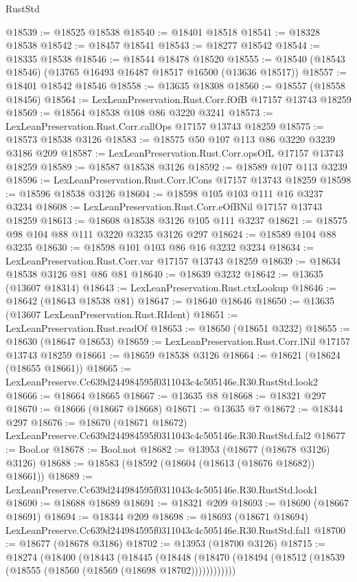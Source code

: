 \begin{lexlean}{RustStd}
\begin{coremodule}
@18539 := @18525 @18538
@18540 := @18401 @18518
@18541 := @18328 @18538
@18542 := @18457 @18541
@18543 := @18277 @18542
@18544 := @18335 @18538
@18546 := @18544 @18478 @18520
@18555 := @18540 (@18543 @18546) (@13765 @16493 @16487 @18517 @16500 (@13636 @18517))
@18557 := @18401 @18542 @18546
@18558 := @13635 @18308
@18560 := @18557 (@18558 @18456)
@18564 := LexLeanPreservation.Rust.Corr.fOfB @17157 @13743 @18259
@18569 := @18564 @18538 @108 @86 @3220 @3241
@18573 := LexLeanPreservation.Rust.Corr.callOps @17157 @13743 @18259
@18575 := @18573 @18538 @3126
@18583 := @18575 @50 @107 @113 @86 @3220 @3239 @3186 @209
@18587 := LexLeanPreservation.Rust.Corr.opsOfL @17157 @13743 @18259
@18589 := @18587 @18538 @3126
@18592 := @18589 @107 @113 @3239
@18596 := LexLeanPreservation.Rust.Corr.lCons @17157 @13743 @18259
@18598 := @18596 @18538 @3126
@18604 := @18598 @105 @103 @111 @16 @3237 @3234
@18608 := LexLeanPreservation.Rust.Corr.eOfBNil @17157 @13743 @18259
@18613 := @18608 @18538 @3126 @105 @111 @3237
@18621 := @18575 @98 @104 @88 @111 @3220 @3235 @3126 @297
@18624 := @18589 @104 @88 @3235
@18630 := @18598 @101 @103 @86 @16 @3232 @3234
@18634 := LexLeanPreservation.Rust.Corr.var @17157 @13743 @18259
@18639 := @18634 @18538 @3126 @81 @86 @81
@18640 := @18639 @3232
@18642 := @13635 (@13607 @18314)
@18643 := LexLeanPreservation.Rust.ctxLookup
@18646 := @18642 (@18643 @18538 @81)
@18647 := @18640 @18646
@18650 := @13635 (@13607 LexLeanPreservation.Rust.RIdent)
@18651 := LexLeanPreservation.Rust.readOf
@18653 := @18650 (@18651 @3232)
@18655 := @18630 (@18647 @18653)
@18659 := LexLeanPreservation.Rust.Corr.lNil @17157 @13743 @18259
@18661 := @18659 @18538 @3126
@18664 := @18621 (@18624 (@18655 @18661))
@18665 := LexLeanPreserve.Cc639d244984595f0311043c4c505146e.R30.RustStd.look2
@18666 := @18664 @18665
@18667 := @13635 @8
@18668 := @18321 @297
@18670 := @18666 (@18667 @18668)
@18671 := @13635 @7
@18672 := @18344 @297
@18676 := @18670 (@18671 @18672) LexLeanPreserve.Cc639d244984595f0311043c4c505146e.R30.RustStd.fal2
@18677 := Bool.or
@18678 := Bool.not
@18682 := @13953 (@18677 (@18678 @3126) @3126)
@18688 := @18583 (@18592 (@18604 (@18613 (@18676 @18682)) @18661))
@18689 := LexLeanPreserve.Cc639d244984595f0311043c4c505146e.R30.RustStd.look1
@18690 := @18688 @18689
@18691 := @18321 @209
@18693 := @18690 (@18667 @18691)
@18694 := @18344 @209
@18698 := @18693 (@18671 @18694) LexLeanPreserve.Cc639d244984595f0311043c4c505146e.R30.RustStd.fal1
@18700 := @18677 (@18678 @3186)
@18702 := @13953 (@18700 @3126)
@18715 := @18274
    (@18400
      (@18443
        (@18445
          (@18448 (@18470 (@18494 (@18512 (@18539 (@18555 (@18560 (@18569 (@18698 @18702))))))))))))

\end{coremodule}
\end{lexlean}
